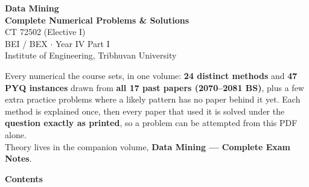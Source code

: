 \documentclass[10pt]{article}
\begin{document}
\thispagestyle{empty}
\vspace*{2.2cm}
\begin{center}
  {\Huge\bfseries\color{acc} Data Mining}\\[6pt]
  {\LARGE\bfseries Complete Numerical Problems \& Solutions}\\[14pt]
  {\large\color{sub} CT 72502 (Elective I)}\\[3pt]
  {\color{sub} BEI / BEX $\cdot$ Year IV Part I}\\[3pt]
  {\color{sub} Institute of Engineering, Tribhuvan University}\\[22pt]
  \begin{minipage}{0.76\textwidth}
    \color{sub}\small
    Every numerical the course sets, in one volume: \textbf{24 distinct methods} and
    \textbf{47 PYQ instances} drawn from \textbf{all 17 past papers (2070--2081 BS)},
    plus a few extra practice problems where a likely pattern has no paper behind it
    yet. Each method is explained once, then every paper that used it is solved under
    the \textbf{question exactly as printed}, so a problem can be attempted from this
    PDF alone. \\[8pt]
    Theory lives in the companion volume,
    \textbf{Data Mining --- Complete Exam Notes}.
  \end{minipage}
\end{center}

\vfill

\vspace{1.4cm}

\cleardoublepage
\pagestyle{fancy}
{\Large\bfseries\color{acc} Contents}
\vspace{-6pt}{\color{acc}\rule{\textwidth}{1.1pt}}\vspace{4pt}
\begingroup
\renewcommand{\contentsname}{}
\setcounter{tocdepth}{1}
\vspace{-24pt}
\tableofcontents
\endgroup

\cleardoublepage
{}
{}

\end{document}
